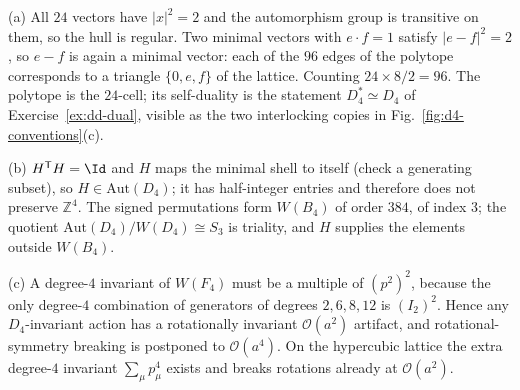 {(a) All $24$ vectors have $|x|^2=2$ and the automorphism group is transitive on
them, so the hull is regular. Two minimal vectors with $e\cdot f=1$ satisfy
$|e-f|^2=2$, so $e-f$ is again a minimal vector: each of the $96$ edges of the
polytope corresponds to a triangle $\{0,e,f\}$ of the lattice. Counting
$24\times8/2=96$. The polytope is the $24$-cell; its self-duality is the
statement $D_4^{*}\simeq D_4$ of Exercise~\ref{ex:dd-dual}, visible as the two
interlocking copies in Fig.~\ref{fig:d4-conventions}(c).

(b) $H^{\mathsf T}H=\Id$ and $H$ maps the minimal shell to itself (check
a generating subset), so $H\in\mathrm{Aut}(D_4)$; it has half-integer entries
and therefore does not preserve $\mathbb{Z}^4$. The signed permutations form
$W(B_4)$ of order $384$, of index $3$; the quotient
$\mathrm{Aut}(D_4)/W(D_4)\cong S_3$ is triality, and $H$ supplies the elements
outside $W(B_4)$.

(c) A degree-$4$ invariant of $W(F_4)$ must be a multiple of $(p^2)^2$, because
the only degree-$4$ combination of generators of degrees $2,6,8,12$ is
$(I_2)^2$. Hence any $D_4$-invariant action has a rotationally invariant
$\mathcal{O}(a^2)$ artifact, and rotational-symmetry breaking is postponed to
$\mathcal{O}(a^4)$. On the hypercubic lattice the extra degree-$4$ invariant
$\sum_\mu p_\mu^4$ exists and breaks rotations already at $\mathcal{O}(a^2)$.}

